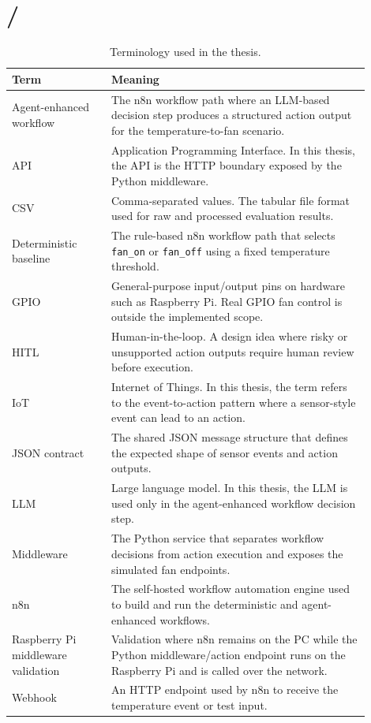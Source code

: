 \clearpage
\section*{/}\label{sec:terminology}
{}

\begin{table}[H]
	\centering
	\small
	\caption{Terminology used in the thesis.}
	\label{tab:terminology}
	\begin{tabular}{@{}p{0.25\linewidth}p{0.65\linewidth}@{}}
		\toprule
		Term & Meaning \\
		\midrule
		Agent-enhanced workflow & The n8n workflow path where an LLM-based decision step produces a structured action output for the temperature-to-fan scenario. \\
		API & Application Programming Interface. In this thesis, the API is the HTTP boundary exposed by the Python middleware. \\
		CSV & Comma-separated values. The tabular file format used for raw and processed evaluation results. \\
		Deterministic baseline & The rule-based n8n workflow path that selects \texttt{fan\_on} or \texttt{fan\_off} using a fixed temperature threshold. \\
		GPIO & General-purpose input/output pins on hardware such as Raspberry Pi. Real GPIO fan control is outside the implemented scope. \\
		HITL & Human-in-the-loop. A design idea where risky or unsupported action outputs require human review before execution. \\
		IoT & Internet of Things. In this thesis, the term refers to the event-to-action pattern where a sensor-style event can lead to an action. \\
		JSON contract & The shared JSON message structure that defines the expected shape of sensor events and action outputs. \\
		LLM & Large language model. In this thesis, the LLM is used only in the agent-enhanced workflow decision step. \\
		Middleware & The Python service that separates workflow decisions from action execution and exposes the simulated fan endpoints. \\
		n8n & The self-hosted workflow automation engine used to build and run the deterministic and agent-enhanced workflows. \\
		Raspberry Pi middleware validation & Validation where n8n remains on the PC while the Python middleware/action endpoint runs on the Raspberry Pi and is called over the network. \\
		Webhook & An HTTP endpoint used by n8n to receive the temperature event or test input. \\
		\bottomrule
	\end{tabular}
\end{table}
